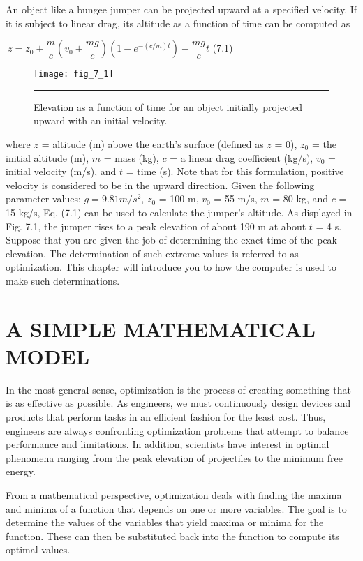 \documentclass[../main.tex]{subfiles}
\begin{document}
\smallskip
\color{black}
\normalsize{An object like a bungee jumper can be projected upward at a specified velocity. If it
is subject to linear drag, its altitude as a function of time can be computed as}
\smallskip
\begin{center}
\large{$\ z=z_0+\dfrac{m}{c}(v_0+\dfrac{mg}{c})(1-e^{-(c/m)t})-\dfrac{mg}{c}t$} \hfill {(7.1)}
\normalsize
\end{center}
\begin{figure}[H]
	\centering
	\texttt{[image: fig\_7\_1]}
	\caption{\textsf{Elevation as a function of time for an object initially projected upward with an initial velocity.}}
	\color{cyan} \rule{\linewidth}{0,5mm}
	\label{fig:fig_7_1}
\end{figure}
where $z$ = altitude (m) above the earth's surface (defined as $z$ = 0), $z_0$ = the initial altitude
(m), $m$ = mass (kg), $c$ = a linear drag coefficient (kg/s), $v_0$ = initial velocity (m/s), and $t$ =
time (s). Note that for this formulation, positive velocity is considered to be in the upward
direction. Given the following parameter values: $g = 9.81 m/s^2$, $z_0$ = 100 m, $v_0$ = 55 m/s,
$m$ = 80 kg, and $c$ = 15 kg/s, Eq. (7.1) can be used to calculate the jumper's altitude. As
displayed in Fig. 7.1, the jumper rises to a peak elevation of about 190 m at about $t$ = 4 s.
Suppose that you are given the job of determining the exact time of the peak elevation.
The determination of such extreme values is referred to as optimization. This chapter will
introduce you to how the computer is used to make such determinations.\bigskip

\section{A SIMPLE MATHEMATICAL MODEL}
\label{sec:sec_7_1}

In the most general sense, optimization is the process of creating something that is as
effective as possible. As engineers, we must continuously design devices and products that
perform tasks in an efficient fashion for the least cost. Thus, engineers are always confronting
optimization problems that attempt to balance performance and limitations. In
addition, scientists have interest in optimal phenomena ranging from the peak elevation of
projectiles to the minimum free energy.

From a mathematical perspective, optimization deals with finding the maxima and
minima of a function that depends on one or more variables. The goal is to determine the
values of the variables that yield maxima or minima for the function. These can then be
substituted back into the function to compute its optimal values.
\end{document}
